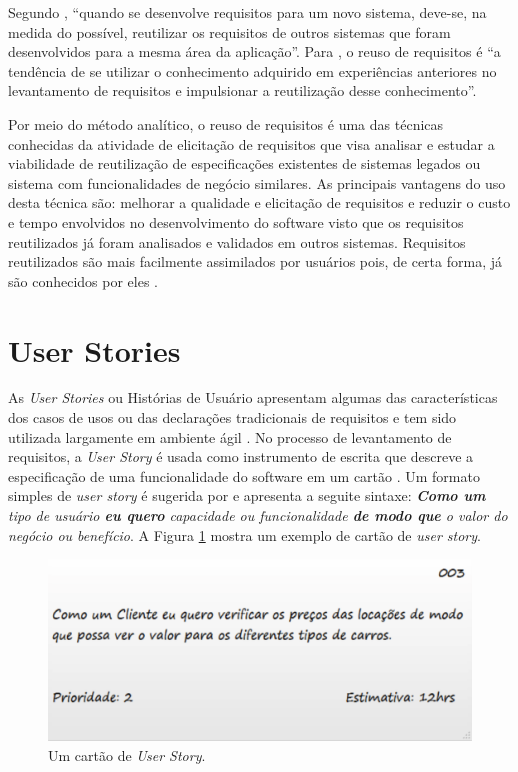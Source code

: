 Segundo \cite{sommerville2004software}, ``quando se desenvolve requisitos para um novo sistema, deve-se, na medida do possível, reutilizar os requisitos de outros sistemas que foram desenvolvidos para a mesma área da aplicação''. Para \cite{pabre}, o reuso de requisitos é ``a tendência de se utilizar o conhecimento adquirido em experiências anteriores no levantamento de requisitos e impulsionar a reutilização desse conhecimento''.

Por meio do método analítico, o reuso de requisitos é uma das técnicas conhecidas da atividade de elicitação de requisitos que visa analisar e estudar a viabilidade de reutilização de especificações existentes de sistemas legados ou sistema com funcionalidades de negócio similares. As principais vantagens do uso desta técnica são: melhorar a qualidade e elicitação de requisitos e reduzir o custo e tempo envolvidos no desenvolvimento do software visto que os requisitos reutilizados já foram analisados e validados em outros sistemas. Requisitos reutilizados são mais facilmente assimilados por usuários pois, de certa forma, já são conhecidos por eles \cite{brunobrum}.

\section{User Stories}

As \textit{User Stories} ou Histórias de Usuário apresentam algumas das características dos casos de usos ou das declarações tradicionais de requisitos e tem sido utilizada largamente em ambiente ágil \cite{cohn2004user}. No processo de levantamento de requisitos, a \textit{User Story} é usada como instrumento de escrita que descreve a especificação de uma funcionalidade do software em um cartão \cite{beck2001planning}. Um formato simples de \textit{user story} é sugerida por \cite{cohn2004user} e apresenta a seguite sintaxe: \textit{\textbf{Como um} tipo de usuário \textbf{eu quero} capacidade ou funcionalidade \textbf{de modo que} o valor do negócio ou benefício}. A Figura \ref{userstory} mostra um exemplo de cartão de \textit{user story}.

\begin{figure}[ht]
	\centering
		\includegraphics[keepaspectratio=true,scale=0.5]{figuras/userstory.eps}
	\caption{Um cartão de \textit{User Story}.}
	\label{userstory}
\end{figure}

